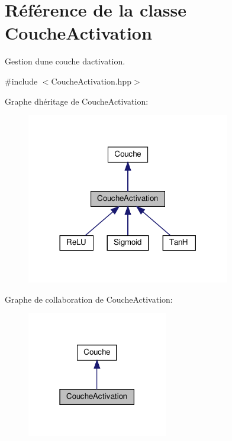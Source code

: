 \hypertarget{class_couche_activation}{}\section{Référence de la classe Couche\+Activation}
\label{class_couche_activation}


Gestion d\textquotesingle{}une couche d\textquotesingle{}activation.  




{\ttfamily \#include $<$Couche\+Activation.\+hpp$>$}



Graphe d\textquotesingle{}héritage de Couche\+Activation\+:\nopagebreak
\begin{figure}[H]
\begin{center}
\leavevmode
\includegraphics[width=252pt]{class_couche_activation__inherit__graph}
\end{center}
\end{figure}


Graphe de collaboration de Couche\+Activation\+:\nopagebreak
\begin{figure}[H]
\begin{center}
\leavevmode
\includegraphics[width=174pt]{class_couche_activation__coll__graph}
\end{center}
\end{figure}
